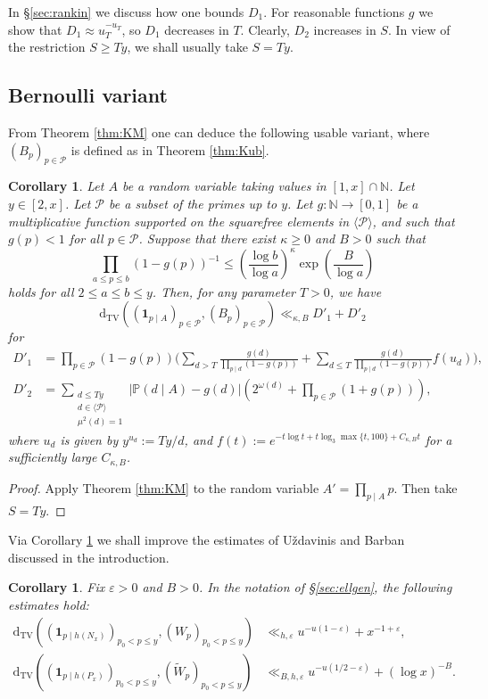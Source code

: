 \documentclass{article}
\theoremstyle{plain}
\newtheorem{cor}[thm]{Corollary}
\theoremstyle{remark}
\newcommand{\PP}{\mathbb{P}}
\newcommand{\NN}{\mathbb{N}}
\newcommand{\Pa}{\mathcal{P}}
\newcommand{\dtv}{\mathrm{d}_{\mathrm{TV}}}
\numberwithin{equation}{section}
\begin{document}
In \S\ref{sec:rankin} we discuss how one bounds $D_1$. For reasonable functions $g$ we show that $D_1\approx u_T^{-u_T}$, so $D_1$ decreases in $T$. Clearly, $D_2$ increases in $S$. In view of the restriction $S\ge Ty$, we shall usually take $S=Ty$.
\subsection{Bernoulli variant}
From Theorem \ref{thm:KM} one can deduce the following usable variant, where $(B_p)_{p \in \mathcal{P}}$ is defined as in Theorem \ref{thm:Kub}.
\begin{cor}\label{cor:KM}
	Let $A$ be a random variable  taking values in $[1,x]\cap \NN$. Let $y\in [2,x]$. Let $\Pa$ be a subset of the primes up to $y$. Let $g\colon \NN\to [0,1]$ be a multiplicative function supported on the squarefree elements in $\langle \Pa \rangle$, and such that $g(p)<1$ for all $p\in \Pa$. Suppose that there exist $\kappa\ge 0$ and $B>0$ such that
	\begin{equation}\label{eq:iwaniecdd}
		\prod_{a\le p \le b} \left( 1-g(p)\right)^{-1} \le \left( \frac{\log b}{\log a}\right)^{\kappa}\exp\left( \frac{B}{\log a}\right)
	\end{equation}
	holds for all $2\le a \le b\le y$. Then, 	for any parameter $T>0$, we have
	\[	\dtv( (\mathbf{1}_{p\mid A})_{p\in\Pa}, (B_p)_{p\in \Pa}) \ll_{\kappa,B} D'_1+D'_2\]
	for
	\begin{align*}
		D'_1 &=\prod_{p\in \Pa}(1-g(p))\bigg(\sum_{d>T}\frac{g(d)}{\prod_{p\mid d}(1-g(p))}+\sum_{ d \le T} \frac{g(d)}{\prod_{p\mid d}(1-g(p))}f(u_d)\bigg),\\
		D'_2 &=  \sum_{\substack{d\le Ty\\ d \in \langle \Pa\rangle \\ \mu^2(d)=1}} |\PP(d\mid A)-g(d)|(2^{\omega(d)}+\prod_{p\in \Pa}(1+g(p))),
	\end{align*}
	where $u_d$ is given by $y^{u_d} := Ty/d$, and $f(t):=e^{-t\log t+t\log_3 \max\{t,100\}+C_{\kappa,B}t}$ for a sufficiently large   $C_{\kappa,B}$.
\end{cor}
\begin{proof}
	Apply Theorem \ref{thm:KM} to the random variable $A'= \prod_{p \mid A}p$. Then take $S=Ty$.
\end{proof}
Via Corollary \ref{cor:KM} we shall improve the estimates of U\v{z}davinis and Barban discussed in the introduction.
\begin{cor}\label{cor:bern}
Fix $\varepsilon>0$ and $B>0$. In the notation of \S\ref{sec:ellgen}, the following estimates hold:
\begin{align}\label{eq:Uzdavinisimp}
	\dtv( (\mathbf{1}_{p\mid h(N_x)})_{p_0<p\le y}, (W_p)_{p_0<p\le y})&\ll_{h,\varepsilon}  u^{-u(1-\varepsilon)}+x^{-1+\varepsilon},\\
\label{eq:Barbanimp}
	\dtv( (\mathbf{1}_{p\mid h(P_x)})_{p_0<p\le y}, (\widetilde{W}_p)_{p_0<p\le y})&\ll_{B,h,\varepsilon} u^{-u(1/2-\varepsilon)}+(\log x)^{-B}.
\end{align}
\end{cor}
\end{document}
